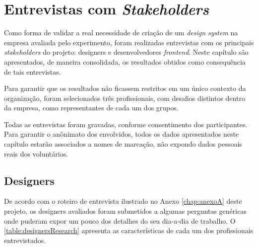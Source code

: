 
\chapter{Entrevistas com \textit{Stakeholders}}
\label{chap:entrevistas}


Como forma de validar a real necessidade de criação de um \textit{design system} na empresa avaliada pelo experimento, foram realizadas entrevistas com os principais \textit{stakeholders} do projeto: designers e desenvolvedores \textit{frontend}. Neste capítulo são apresentados, de maneira consolidada, os resultados obtidos como consequência de tais entrevistas.

Para garantir que os resultados não ficassem restritos em um único contexto da organização, foram selecionados três profissionais, com desafios distintos dentro da empresa, como representantes de cada um dos grupos.

Todas as entrevistas foram gravadas, conforme consentimento dos participantes. Para garantir o anônimato dos envolvidos, todos os dados apresentados neste capítulo estarão associados a nomes de marcação, não expondo dados pessoais reais dos voluntários.

\section{Designers}
\label{sec:entrevistasDesigners}

De acordo com o roteiro de entrevista ilustrado no Anexo \ref{chap:anexoA} deste projeto, os designers avaliados foram submetidos a algumas perguntas genéricas onde puderam expor um pouco dos detalhes do seu dia-a-dia de trabalho. O \autoref{table:designersResearch} apresenta as características de cada um dos profissionais entrevistados.


